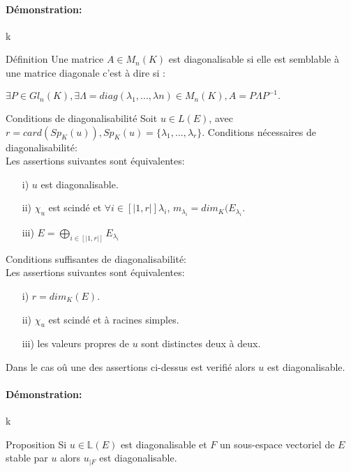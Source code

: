 \documentclass{book}
\begin{document}
\paragraph{Démonstration: }
k
\begin{Définition}[]{Définition}{}
Une matrice \(A \in M_{n}(K)\) est diagonalisable si elle est semblable à une matrice diagonale c'est à dire si :
\begin{center}
\begin{framed}
\(\exists P \in Gl_{n}(K),   \exists \Lambda =diag(\lambda_{1},...,\lambda{n}) \in M_{n}(K), A=P\Lambda P^{-1}.\)
\end{framed}
\end{center}
\end{Définition}
\begin{Propriété}[]{Conditions de diagonalisabilité}{}
Soit \(u \in L(E)\), avec \(r=card(Sp_{K}(u)), Sp_{K}(u)=\{\lambda_{1},...,\lambda_{r}\}\).
Conditions nécessaires de diagonalisabilité: 
\\ Les assertions suivantes sont équivalentes:
\begin{itemize}
    \item[i)] \(u\) est diagonalisable.    \item[ii)] \(\chi_{u}\) est scindé et  \(\forall i \in [|1,r|]\lambda_{i}\), \(m_{\lambda_{i}}=dim_{K}(E_{\lambda_{i}}\).
    \item[iii)] \(E=\bigoplus_{i \in [|1,r|]} E_{\lambda_{i}}\)
\end{itemize}
Conditions suffisantes de diagonalisabilité:
\\ Les assertions suivantes sont équivalentes:
\begin{itemize}
    \item[i)] \(r=dim_{K}(E)\).  \item[ii)] \(\chi_{u}\) est scindé et à racines simples.
    \item[iii)] les valeurs propres de \(u\) sont distinctes deux à deux.
\end{itemize}
Dans le cas oû une des assertions ci-dessus est verifié alors \(u\) est diagonalisable.
\end{Propriété}
\paragraph{Démonstration:}
k
\begin{Propriété}[]{Proposition}{}
Si \(u \in \mathbb{L}(E)\) est diagonalisable et $F$ un sous-espace vectoriel de $E$ stable par $u$ alors \(u_{|F}\) est diagonalisable.
\end{Propriété}
\end{document}
